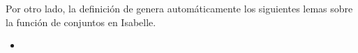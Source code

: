 \begin{isabellebody}
\begin{isamarkuptext}
  Por otro lado, la definición de  genera 
  automáticamente los siguientes lemas sobre la función de conjuntos 
   en Isabelle.
  
  \begin{itemize}
    \item[] 
  \end{itemize} 


\end{isamarkuptext}
\end{isabellebody}
